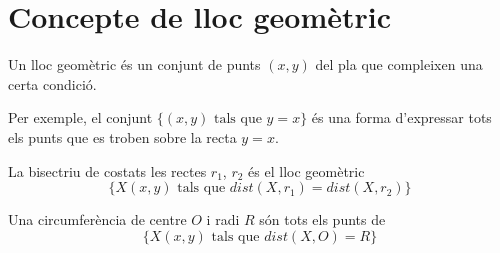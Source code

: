 
\section{Concepte de lloc geomètric}
\begin{theorybox}
	Un lloc geomètric és un conjunt de punts $(x,y)$ del pla que compleixen una certa condició. 
	
	Per exemple, el conjunt  $\{ (x,y) \,\, \text{tals que } y=x \}$ és una forma d'expressar tots els punts que es troben sobre la recta $y=x$.
	
	La bisectriu de costats les rectes $r_1$, $r_2$ és el lloc geomètric  
	\begin{equation*}
	\{X(x,y) \,\, \text{tals que } dist(X,r_1)=dist(X,r_2)\}  
	\end{equation*}
	
	Una circumferència de centre $O$ i radi $R$ són tots els punts de
	\begin{equation*}
	  \{X(x,y) \,\, \text{tals que } dist(X,O)=R\}
	\end{equation*}
\end{theorybox}

